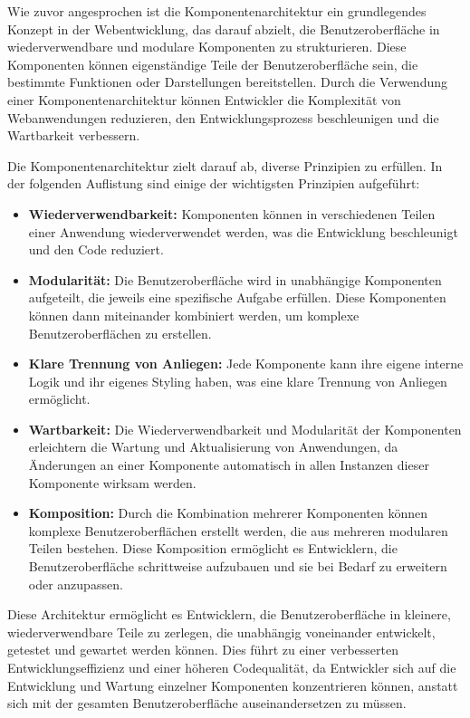 Wie zuvor angesprochen ist die Komponentenarchitektur ein grundlegendes Konzept in der Webentwicklung, das darauf abzielt, die Benutzeroberfläche in wiederverwendbare und modulare Komponenten zu strukturieren. Diese Komponenten können eigenständige Teile der Benutzeroberfläche sein, die bestimmte Funktionen oder Darstellungen bereitstellen. Durch die Verwendung einer Komponentenarchitektur können Entwickler die Komplexität von Webanwendungen reduzieren, den Entwicklungsprozess beschleunigen und die Wartbarkeit verbessern.

Die Komponentenarchitektur zielt darauf ab, diverse Prinzipien zu erfüllen. In der folgenden Auflistung sind einige der wichtigsten Prinzipien aufgeführt:

\begin{itemize}
    \item \textbf{Wiederverwendbarkeit:} Komponenten können in verschiedenen Teilen einer Anwendung wiederverwendet werden, was die Entwicklung beschleunigt und den Code reduziert.
    \item \textbf{Modularität:} Die Benutzeroberfläche wird in unabhängige Komponenten aufgeteilt, die jeweils eine spezifische Aufgabe erfüllen. Diese Komponenten können dann miteinander kombiniert werden, um komplexe Benutzeroberflächen zu erstellen.
    \item \textbf{Klare Trennung von Anliegen:} Jede Komponente kann ihre eigene interne Logik und ihr eigenes Styling haben, was eine klare Trennung von Anliegen ermöglicht.
    \item \textbf{Wartbarkeit:} Die Wiederverwendbarkeit und Modularität der Komponenten erleichtern die Wartung und Aktualisierung von Anwendungen, da Änderungen an einer Komponente automatisch in allen Instanzen dieser Komponente wirksam werden.
    \item \textbf{Komposition:} Durch die Kombination mehrerer Komponenten können komplexe Benutzeroberflächen erstellt werden, die aus mehreren modularen Teilen bestehen. Diese Komposition ermöglicht es Entwicklern, die Benutzeroberfläche schrittweise aufzubauen und sie bei Bedarf zu erweitern oder anzupassen.
\end{itemize}

Diese Architektur ermöglicht es Entwicklern, die Benutzeroberfläche in kleinere, wiederverwendbare Teile zu zerlegen, die unabhängig voneinander entwickelt, getestet und gewartet werden können. Dies führt zu einer verbesserten Entwicklungseffizienz und einer höheren Codequalität, da Entwickler sich auf die Entwicklung und Wartung einzelner Komponenten konzentrieren können, anstatt sich mit der gesamten Benutzeroberfläche auseinandersetzen zu müssen.\cite{component-architecture:1, component-architecture:2}

